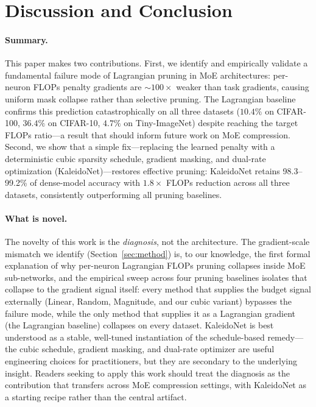 \section{Discussion and Conclusion}
\label{sec:discussion}

\paragraph{Summary.}
This paper makes two contributions. First, we identify and empirically validate a fundamental failure mode of Lagrangian pruning in MoE architectures: per-neuron FLOPs penalty gradients are ${\sim}100{\times}$ weaker than task gradients, causing uniform mask collapse rather than selective pruning. The Lagrangian baseline confirms this prediction catastrophically on all three datasets ($10.4\%$ on CIFAR-100, $36.4\%$ on CIFAR-10, $4.7\%$ on Tiny-ImageNet) despite reaching the target FLOPs ratio---a result that should inform future work on MoE compression. Second, we show that a simple fix---replacing the learned penalty with a deterministic cubic sparsity schedule, gradient masking, and dual-rate optimization (KaleidoNet)---restores effective pruning: KaleidoNet retains 98.3--99.2\% of dense-model accuracy with $1.8{\times}$ FLOPs reduction across all three datasets, consistently outperforming all pruning baselines.

\paragraph{What is novel.}
The novelty of this work is the \emph{diagnosis}, not the architecture. The gradient-scale mismatch we identify (Section~\ref{sec:method}) is, to our knowledge, the first formal explanation of why per-neuron Lagrangian FLOPs pruning collapses inside MoE sub-networks, and the empirical sweep across four pruning baselines isolates that collapse to the gradient signal itself: every method that supplies the budget signal externally (Linear, Random, Magnitude, and our cubic variant) bypasses the failure mode, while the only method that supplies it as a Lagrangian gradient (the Lagrangian baseline) collapses on every dataset. KaleidoNet is best understood as a stable, well-tuned instantiation of the schedule-based remedy---the cubic schedule, gradient masking, and dual-rate optimizer are useful engineering choices for practitioners, but they are secondary to the underlying insight. Readers seeking to apply this work should treat the diagnosis as the contribution that transfers across MoE compression settings, with KaleidoNet as a starting recipe rather than the central artifact.

